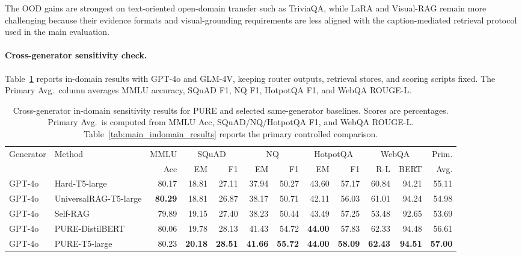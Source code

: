 \documentclass[a4paper,fleqn]{cas-dc}
\begin{document}
The OOD gains are strongest on text-oriented open-domain transfer such as TriviaQA, while LaRA and Visual-RAG remain more challenging because their evidence formats and visual-grounding requirements are less aligned with the caption-mediated retrieval protocol used in the main evaluation.

\paragraph{Cross-generator sensitivity check.}
Table~\ref{tab:cross_generator_pure_results} reports in-domain results with GPT-4o and GLM-4V, keeping router outputs, retrieval stores, and scoring scripts fixed. The Primary Avg.\ column averages MMLU accuracy, SQuAD F1, NQ F1, HotpotQA F1, and WebQA ROUGE-L.

\begin{table}[t]
\centering
\scriptsize
\setlength{\tabcolsep}{2.2pt}
\caption{Cross-generator in-domain sensitivity results for PURE and selected same-generator baselines. Scores are percentages. Primary Avg.\ is computed from MMLU Acc, SQuAD/NQ/HotpotQA F1, and WebQA ROUGE-L. Table~\ref{tab:main_indomain_results} reports the primary controlled comparison.}
\label{tab:cross_generator_pure_results}
\begin{tabular*}{\textwidth}{@{\extracolsep{\fill}}llrrrrrrrrrr@{}}
\toprule
Generator & Method & MMLU & \multicolumn{2}{c}{SQuAD} & \multicolumn{2}{c}{NQ} & \multicolumn{2}{c}{HotpotQA} & \multicolumn{2}{c}{WebQA} & Prim. \\
\cmidrule(lr){1-2}\cmidrule(lr){3-3}\cmidrule(lr){4-5}\cmidrule(lr){6-7}\cmidrule(lr){8-9}\cmidrule(lr){10-11}\cmidrule(lr){12-12}
 & & Acc & EM & F1 & EM & F1 & EM & F1 & R-L & BERT & Avg. \\
\midrule
GPT-4o & Hard-T5-large & 80.17 & 18.81 & 27.11 & 37.94 & 50.27 & 43.60 & 57.17 & 60.84 & 94.21 & 55.11 \\
GPT-4o & UniversalRAG-T5-large & \textbf{80.29} & 18.81 & 26.87 & 38.17 & 50.71 & 42.11 & 56.03 & 61.01 & 94.24 & 54.98 \\
GPT-4o & Self-RAG & 79.89 & 19.15 & 27.40 & 38.23 & 50.44 & 43.49 & 57.25 & 53.48 & 92.65 & 53.69 \\
GPT-4o & PURE-DistilBERT & 80.06 & 19.78 & 28.13 & 41.43 & 54.72 & \textbf{44.00} & 57.83 & 62.33 & 94.48 & 56.61 \\
GPT-4o & PURE-T5-large & 80.23 & \textbf{20.18} & \textbf{28.51} & \textbf{41.66} & \textbf{55.72} & \textbf{44.00} & \textbf{58.09} & \textbf{62.43} & \textbf{94.51} & \textbf{57.00} \\

\end{tabular*}
\end{table}
\end{document}
